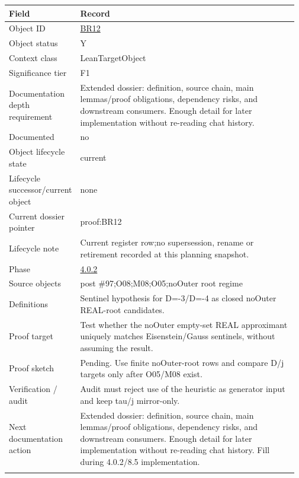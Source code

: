 \begin{longtable}{L{0.16\linewidth} L{0.81\linewidth}}
\hline
\textbf{Field} & \textbf{Record}\\
\hline
Object ID & \hyperlink{object-row-BR12}{BR12}\\
\hline\addlinespace[0.20em]
Object status & Y\\
\hline\addlinespace[0.20em]
Context class & LeanTargetObject\\
\hline\addlinespace[0.20em]
Significance tier & F1\\
\hline\addlinespace[0.20em]
Documentation depth requirement & Extended dossier: definition, source chain, main lemmas/\allowbreak{}proof obligations, dependency risks, and downstream consumers. Enough detail for later implementation without re-reading chat history.\\
\hline\addlinespace[0.20em]
Documented & no\\
\hline\addlinespace[0.20em]
Object lifecycle state & current\\
\hline\addlinespace[0.20em]
Lifecycle successor/\allowbreak{}current object & none\\
\hline\addlinespace[0.20em]
Current dossier pointer & proof:BR12\\
\hline\addlinespace[0.20em]
Lifecycle note & Current register row;\newline no supersession, rename or retirement recorded at this planning snapshot.\\
\hline\addlinespace[0.20em]
Phase & \hyperlink{phase-row-4-0-2}{4.0.2}\\
\hline\addlinespace[0.20em]
Source objects & post \#97;\newline O08;\newline M08;\newline O05;\newline noOuter root regime\\
\hline\addlinespace[0.20em]
Definitions & Sentinel hypothesis for D=-3/\allowbreak{}D=-4 as closed noOuter REAL-root candidates.\\
\hline\addlinespace[0.20em]
Proof target & Test whether the noOuter empty-set REAL approximant uniquely matches Eisenstein/\allowbreak{}Gauss sentinels, without assuming the result.\\
\hline\addlinespace[0.20em]
Proof sketch & Pending. Use finite noOuter-root rows and compare D/\allowbreak{}j targets only after O05/\allowbreak{}M08 exist.\\
\hline\addlinespace[0.20em]
Verification /\allowbreak{} audit & Audit must reject use of the heuristic as generator input and keep tau/\allowbreak{}j mirror-only.\\
\hline\addlinespace[0.20em]
Next documentation action & Extended dossier: definition, source chain, main lemmas/\allowbreak{}proof obligations, dependency risks, and downstream consumers. Enough detail for later implementation without re-reading chat history. Fill during 4.0.2/\allowbreak{}8.5 implementation.\\
\hline\addlinespace[0.20em]
\end{longtable}
